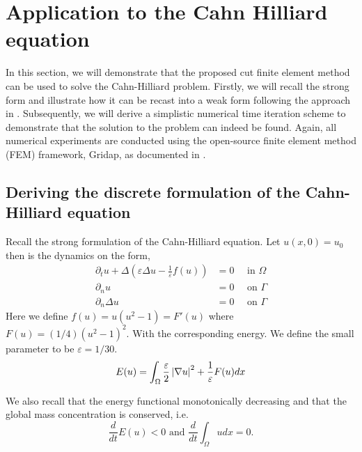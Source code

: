 
\newpage
\section{Application to the Cahn Hilliard equation }%

In this section, we will demonstrate that the proposed cut finite element method can be used to solve the Cahn-Hilliard problem. Firstly, we will recall the strong form and illustrate how it can be recast into a weak form following the approach in
\cite{feng2007fully}. Subsequently, we will derive a simplistic numerical time iteration scheme to demonstrate that the solution to the problem can indeed be found. Again, all numerical experiments are conducted using the open-source finite element method (FEM) framework, Gridap, as documented in \cite{verdugo22}.


\subsection{Deriving the discrete formulation of the Cahn-Hilliard equation}%
\label{sub:revisiting_the_strong_formulation}

 Recall the strong formulation of the Cahn-Hilliard equation.
Let $ u( x,0) =  u_{0}$ then is the dynamics on the form,
\begin{subequations}
\label{eq:strong_ch}
    \begin{align}
\partial _{t} u + \Delta  \left(  \varepsilon  \Delta u - \frac{1}{\varepsilon }f( u) \right)   &=0  \quad \text{ in } \Omega  \\
\partial _{n} u &= 0 \quad \text{ on } \Gamma  \\
\partial _{n}    \Delta u       &= 0 \quad \text{ on } \Gamma
    \end{align}
\end{subequations}
Here we define $f( u) = u( u^{2} -1)  = F' ( u)  $ where $F( u) = ( 1 / 4 ) ( u^2 -1 ) ^{2} $. With the corresponding energy. We define the small parameter to be $\varepsilon  = 1 / 30$.
\begin{equation}
E( u)  = \int_{\Omega }^{} \frac{\varepsilon }{2} \left\lvert  \nabla u  \right\rvert ^2 + \frac{1}{\varepsilon } F( u) dx
\end{equation}

We also recall that the energy functional monotonically decreasing and that the global mass concentration is conserved, i.e.
\begin{equation}
\label{eq:mass_cons_energy_decrease2}
\frac{d}{dt} E( u)  <  0 \text{ and }\frac{d}{dt} \int_{\Omega }^{}  u dx = 0.
\end{equation}

